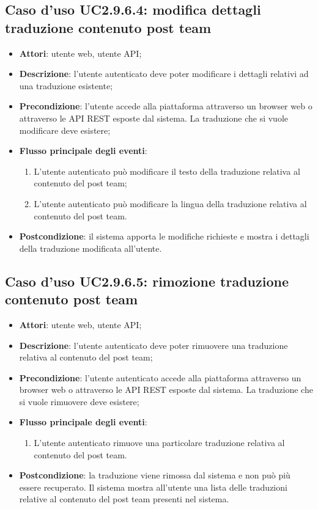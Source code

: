 \subsection{Caso d'uso UC2.9.6.4: modifica dettagli traduzione contenuto post  team}
\begin{itemize}
\item \textbf{Attori}: utente web, utente API;
\item \textbf{Descrizione}: l'utente autenticato deve poter modificare i dettagli relativi ad una traduzione esistente; 
      \item \textbf{Precondizione}: l'utente accede alla piattaforma attraverso un browser web o attraverso le API REST esposte dal sistema. La traduzione che si vuole modificare deve esistere;

        \item \textbf{Flusso principale degli eventi}:
          \begin{enumerate}
          \item L'utente autenticato può modificare il testo della traduzione relativa al contenuto del post team;
          \item L'utente autenticato può modificare la lingua della traduzione relativa al contenuto del post team.

      \end{enumerate}
    \item \textbf{Postcondizione}: il sistema apporta le modifiche richieste e mostra i dettagli della traduzione modificata all'utente.
  \end{itemize}
\hypertarget{UC2.9.6.5}{}
\subsection{Caso d'uso UC2.9.6.5: rimozione traduzione contenuto post team}
\begin{itemize}
\item \textbf{Attori}: utente web, utente API;
\item \textbf{Descrizione}: l'utente autenticato deve poter rimuovere una traduzione relativa al contenuto del post team; 
      \item \textbf{Precondizione}: l'utente autenticato accede alla piattaforma attraverso un browser web o attraverso le API REST esposte dal sistema. La traduzione che si vuole rimuovere deve esistere;

        \item \textbf{Flusso principale degli eventi}:
          \begin{enumerate}
          \item L'utente autenticato rimuove una particolare traduzione relativa al contenuto del post team.

      \end{enumerate}
    \item \textbf{Postcondizione}: la traduzione viene rimossa dal sistema e non può più essere recuperato. Il sistema mostra all'utente una lista delle traduzioni relative al contenuto del post team presenti nel sistema.
  \end{itemize}
\hypertarget{UC2.9.7}{}
